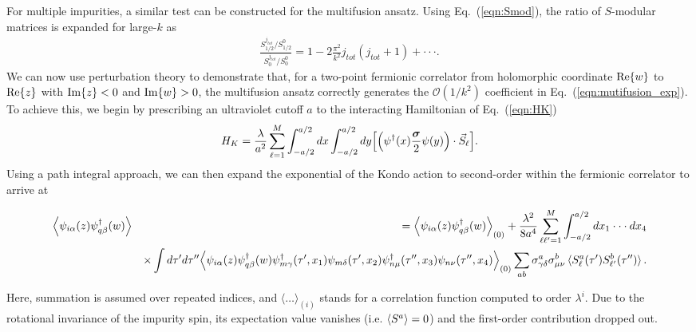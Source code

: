 \documentclass[aps,prb,twocolumn,superscriptaddress]{revtex4-1}
\begin{document}
For multiple impurities, a similar test can be constructed for the multifusion ansatz. Using Eq.~(\ref{eqn:Smod}), the ratio of $S$-modular matrices is expanded for large-$k$ as
\begin{eqnarray}
	\frac{S_{1/2}^{j_{tot}}/S_{1/2}^{0}}{S_{0}^{j_{tot}}/S_{0}^{0}}=1-2\frac{\pi^{2}}{k^{2}}j_{tot}(j_{tot}+1)+\cdot\cdot\cdot. \label{eqn:mutifusion_exp}
\end{eqnarray}
We can now use perturbation theory to demonstrate that, for a two-point fermionic correlator from holomorphic coordinate $\textup{Re}\{w\}$ to $\textup{Re}\{z\}$ with $\textup{Im}\{z\}<0$ and $\textup{Im}\{w\}>0$, the multifusion ansatz correctly generates the $\mathcal{O}(1/k^{2})$ coefficient in Eq.~(\ref{eqn:mutifusion_exp}). To achieve this, we begin by prescribing an ultraviolet cutoff $a$ to the interacting Hamiltonian of Eq.~(\ref{eqn:HK}) 
\begin{eqnarray}
H_{K}=\frac{\lambda}{a^{2}}\sum_{\ell=1}^{M}\int_{-a/2}^{a/2}{dx}\int_{-a/2}^{a/2}{dy}\Bigl[\Bigl(\psi^{\dagger}(x)\frac{\bm{\sigma}}{2}\psi(y)\Bigr)\cdot\vec{S}_{\ell}\Bigr]. \nonumber \\ \label{eqn:HK_ultra}
\end{eqnarray}
Using a path integral approach, we can then expand the exponential of the Kondo action to second-order within the fermionic correlator to arrive at
\begin{widetext}
\begin{eqnarray}
\label{eq:beforepause}\Bigl\langle{\psi_{i\alpha}(z)\psi_{q\beta}^{\dagger}(w)\Bigr\rangle}&&=\Bigl\langle{\psi_{i\alpha}(z)\psi_{q\beta}^{\dagger}(w)\Bigr\rangle}_{(0)}+\frac{\lambda^{2}}{8a^{4}}\sum_{\ell\ell'=1}^{M}\int_{-a/2}^{a/2}{dx_{1}\cdot\cdot\cdot dx_{4}} \label{eqn:asym_largek_0} \\
&&\times\int{d\tau'd\tau''}\Bigl\langle{\psi_{i\alpha}(z)\psi_{q\beta}^{\dagger}(w)\psi_{m\gamma}^{\dagger}(\tau',x_{1})\psi_{m\delta}(\tau',x_{2})\psi_{n\mu}^{\dagger}(\tau'',x_{3})\psi_{n\nu}(\tau'',x_{4})\Bigr\rangle_{(0)}}\sum_{ab}\sigma^{a}_{\gamma\delta}\sigma^{b}_{\mu\nu}\braket{S_{\ell}^{a}(\tau')S_{\ell'}^{b}(\tau'')}. \nonumber 
\end{eqnarray}
\end{widetext}
Here, summation is assumed over repeated indices, and $\langle \dots \rangle_{(i)}$ stands for a  correlation function computed to order $\lambda^i$. Due to the rotational invariance of the impurity spin, its expectation value vanishes (i.e. $\braket{S^{a}}=0$) and the first-order contribution dropped out. 
\end{document}
